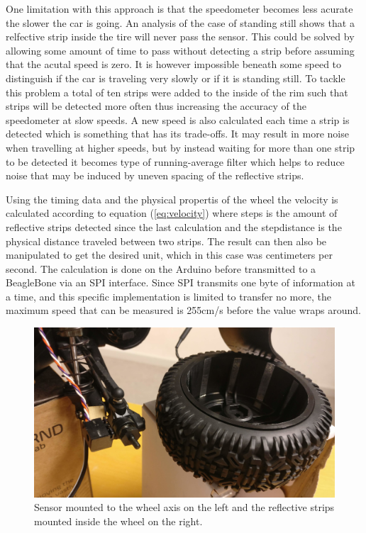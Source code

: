\documentclass[11pt, titlepage]{article} %
\begin{document}
One limitation with this approach is that the speedometer becomes less acurate the slower the car is going. An analysis of the case of standing still shows that a relfective strip inside the tire will never pass the sensor. This could be solved by allowing some amount of time to pass without detecting a strip before assuming that the acutal speed is zero. It is however impossible beneath some speed to distinguish if the car is traveling very slowly or if it is standing still. To tackle this problem a total of ten strips were added to the inside of the rim such that strips will be detected more often thus increasing the accuracy of the speedometer at slow speeds. A new speed is also calculated each time a strip is detected which is something that has its trade-offs. It may result in more noise when travelling at higher speeds, but by instead waiting for more than one strip to be detected it becomes type of running-average filter which helps to reduce noise that may be induced by uneven spacing of the reflective strips.

    Using the timing data and the physical propertis of the wheel the velocity is calculated according to equation (\ref{eq:velocity}) where steps is the amount of reflective strips detected since the last calculation and the stepdistance is the physical distance traveled between two strips. The result can then also be manipulated to get the desired unit, which in this case was centimeters per second. The calculation is done on the Arduino before transmitted to a BeagleBone via an SPI interface. Since SPI transmits one byte of information at a time, and this specific implementation is limited to transfer no more, the maximum speed that can be measured is 255cm/s before the value wraps around.

\begin{figure}[]
	\centering
   	\includegraphics[scale=0.5]{speedometer.jpg}
   	\caption{Sensor mounted to the wheel axis on the left and the reflective strips mounted inside the wheel on the right.}
    \label{fig:speedometer}
\end{figure}
\end{document}
